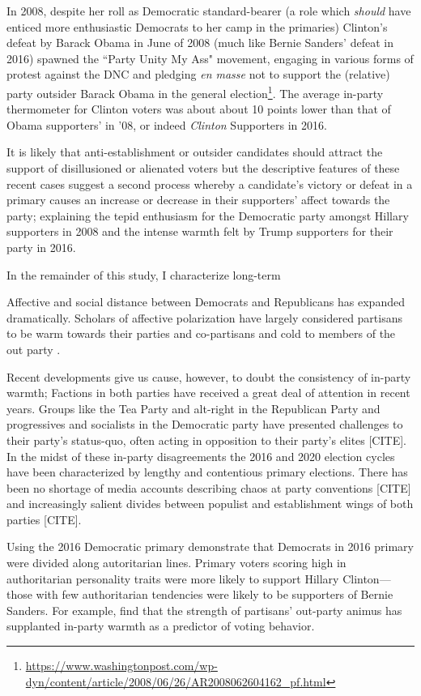 \documentclass[12pt]{paper}
\begin{document}
In 2008, despite her roll as Democratic standard-bearer (a role which \textit{should} have enticed more enthusiastic Democrats to her camp in the primaries) Clinton's defeat by Barack Obama in June of 2008 (much like Bernie Sanders' defeat in 2016) spawned the ``Party Unity My Ass" movement, engaging in various forms of protest against the DNC and pledging \textit{en masse} not to support the (relative) party outsider Barack Obama in the general election\footnote{\url{https://www.washingtonpost.com/wp-dyn/content/article/2008/06/26/AR2008062604162_pf.html}}. The average in-party thermometer for Clinton voters was about about 10 points lower than that of Obama supporters' in '08, or indeed \textit{Clinton} Supporters in 2016.

It is likely that anti-establishment or outsider candidates should attract the support of disillusioned or alienated voters but the descriptive features of these recent cases suggest a second process whereby a candidate's victory or defeat in a primary causes an increase or decrease in their supporters' affect towards the party; explaining the tepid enthusiasm for the Democratic party amongst Hillary supporters in 2008 and the intense warmth felt by Trump supporters for their party in 2016.

In the remainder of this study, I characterize long-term 


Affective and social distance between Democrats and Republicans has expanded dramatically. Scholars of affective polarization have largely considered partisans to be warm towards their parties and co-partisans and cold to members of the out party \citep{iyengar2012affect, iyengar2018strengthening}.


Recent developments give us cause, however, to doubt the consistency of in-party warmth; Factions in both parties have received a great deal of attention in recent years. Groups like the Tea Party and alt-right in the Republican Party and progressives and socialists in the Democratic party have presented challenges to their party's status-quo, often acting in opposition to their party's elites [CITE]. In the midst of these in-party disagreements the 2016 and 2020 election cycles have been characterized by lengthy and contentious primary elections. There has been no shortage of media accounts describing chaos at party conventions [CITE] and increasingly salient divides between populist and establishment wings of both parties [CITE]. 

Using the 2016 Democratic primary \cite{wronski2018tale} demonstrate that Democrats in 2016 primary were divided along autoritarian lines. Primary voters scoring high in authoritarian personality traits were more likely to support Hillary Clinton---those with few authoritarian tendencies were likely to be supporters of Bernie Sanders. For example, \cite{iyengar2018strengthening} find that the strength of partisans' out-party animus has supplanted in-party warmth as a predictor of voting behavior. 
\end{document}
